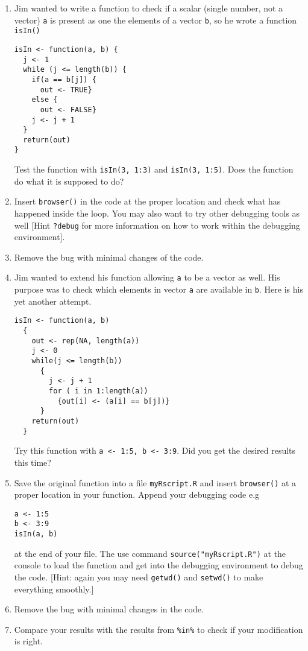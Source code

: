 \documentclass[a4paper]{article}
\begin{document}
\begin{enumerate}

\item Jim wanted to write a function to check if a scalar (single number, not a vector) \texttt{a}
is present as one the elements of a vector \texttt{b}, so he wrote a function
\texttt{isIn()} 

\begin{verbatim}
isIn <- function(a, b) { 
  j <- 1
  while (j <= length(b)) {
    if(a == b[j]) {
      out <- TRUE}
    else {
      out <- FALSE}
    j <- j + 1
  }
  return(out)
}
\end{verbatim}

Test the function with \texttt{isIn(3, 1:3)} and \texttt{isIn(3, 1:5)}. Does
the function do what it is supposed to do?

\item Insert \texttt{browser()} in the code at the proper location and check
  what has happened inside the loop. You may also want to try other debugging
  tools as well [Hint \texttt{?debug} for more information on how to work
  within the debugging environment].

\item Remove the bug with minimal changes of the code.

\item Jim wanted to extend his function allowing \texttt{a} to be a vector as
  well. His purpose was to check which elements in vector \texttt{a} are
  available in \texttt{b}. Here is his yet another attempt.

\newpage
\begin{verbatim}
isIn <- function(a, b)
  { 
    out <- rep(NA, length(a))    
    j <- 0
    while(j <= length(b))
      {
        j <- j + 1
        for ( i in 1:length(a))
          {out[i] <- (a[i] == b[j])}
      }
    return(out)
  }
\end{verbatim}

  Try this function with \texttt{a <- 1:5, b <- 3:9}. Did you get the desired
  results this time?

\item Save the original function into a file \texttt{myRscript.R} and
  insert \texttt{browser()} at a proper location in your function. Append your
  debugging code e.g 

\begin{verbatim}
a <- 1:5 
b <- 3:9
isIn(a, b)
\end{verbatim}
  at the end of your file. The use command \texttt{source("myRscript.R")} at
  the console to load the function and get into the debugging environment to
  debug the code. [Hint: again you may need \texttt{getwd()} and
  \texttt{setwd()} to make everything smoothly.]

\item Remove the bug with minimal changes in the code.
\item Compare your results with the results from \texttt{\%in\%} to check if
  your modification is right.
\end{enumerate}
\end{document}
